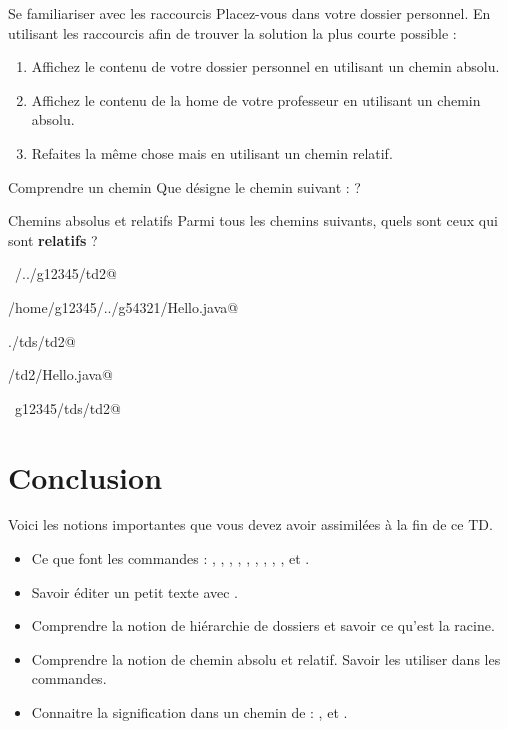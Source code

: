\documentclass[a4paper,11pt]{style-esi/td}
\begin{document}
		\begin{Exercice}{Se familiariser avec les raccourcis}
			Placez-vous dans votre dossier personnel.
			En utilisant les raccourcis 
			afin de trouver la solution la plus courte possible :
			\begin{enumerate}
			\item Affichez le contenu de votre dossier personnel
				en utilisant un chemin absolu.
			\item Affichez le contenu de la home de votre professeur
				en utilisant un chemin absolu.
			\item Refaites la même chose mais en utilisant un chemin relatif.
			\end{enumerate}
		\end{Exercice}

		\begin{Exercice}{Comprendre un chemin}
			Que désigne le chemin suivant :
			 ?
		\end{Exercice}

		\begin{Exercice}{Chemins absolus et relatifs}
			Parmi tous les chemins suivants, quels sont ceux qui sont 
			\textbf{relatifs} ?			
			\begin{selectmany} 
			\item \verb@~/../g12345/td2@
			\item \verb@/home/g12345/../g54321/Hello.java@
			\item \verb@./tds/td2@
			\item \verb@tds/td2/Hello.java@
			\item \verb@~g12345/tds/td2@
			\end{selectmany} 
		\end{Exercice}

\section{Conclusion}

	Voici les notions importantes que vous devez avoir assimilées à la fin de ce TD.
	\begin{itemize}
		\item Ce que font les commandes : 
			, , , ,
			, , , 
			, ,  et .
		\item Savoir éditer un petit texte avec .
		\item Comprendre la notion de hiérarchie de dossiers 
			et savoir ce qu'est la racine.
		\item Comprendre la notion de chemin absolu et relatif.
			Savoir les utiliser dans les commandes.
		\item Connaitre la signification dans un chemin de : 
			\og{}\samp{\textasciitilde}\fg{},
			\og{}\fg{} et \og{}\fg{}.
	\end{itemize}
\end{document}
